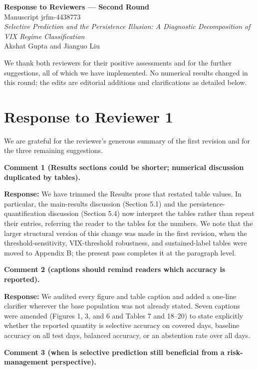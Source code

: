 \documentclass[11pt]{article}
\newcommand{\response}{\textbf{Response:} }
\begin{document}
\begin{center}
{\Large \textbf{Response to Reviewers --- Second Round}}\\[6pt]
Manuscript jrfm-4438773\\
\emph{Selective Prediction and the Persistence Illusion: A Diagnostic Decomposition of VIX
Regime Classification}\\[4pt]
Akshat Gupta and Jianguo Liu
\end{center}

We thank both reviewers for their positive assessments and for the further suggestions, all of
which we have implemented. No numerical results changed in this round; the edits are editorial
additions and clarifications as detailed below.

\section*{Response to Reviewer 1}

We are grateful for the reviewer's generous summary of the first revision and for the three
remaining suggestions.

\textbf{Comment 1 (Results sections could be shorter; numerical discussion duplicated by
tables).}

\response We have trimmed the Results prose that restated table values. In particular, the
main-results discussion (Section 5.1) and the persistence-quantification discussion
(Section 5.4) now interpret the tables rather than repeat their entries, referring the reader
to the tables for the numbers. We note that the larger structural version of this
change was made in the first revision, when the threshold-sensitivity, VIX-threshold
robustness, and sustained-label tables were moved to Appendix B; the present pass completes it
at the paragraph level.

\textbf{Comment 2 (captions should remind readers which accuracy is reported).}

\response We audited every figure and table caption and added a one-line clarifier wherever
the base population was not already stated. Seven captions were amended (Figures 1, 3, and 6
and Tables 7 and 18--20) to state explicitly whether the reported quantity is
selective accuracy on covered days, baseline accuracy on all test days, balanced accuracy, or
an abstention rate over all days.

\textbf{Comment 3 (when is selective prediction still beneficial from a risk-management
perspective).}
\end{document}
